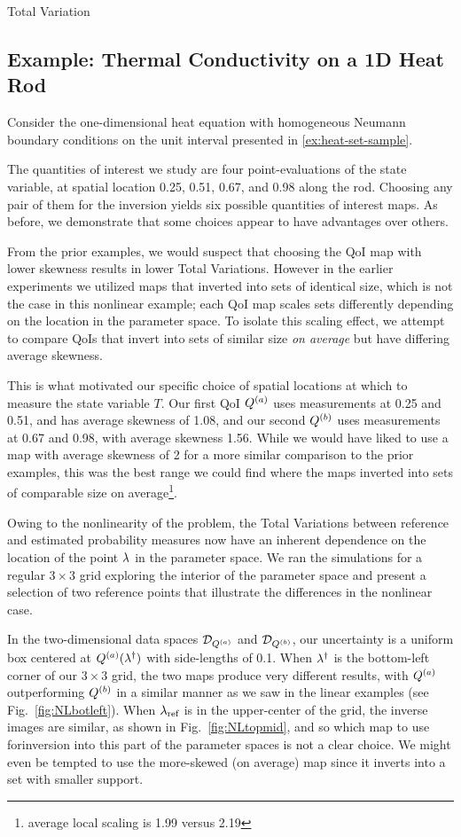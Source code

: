 Total Variation\subsection{Example: Thermal Conductivity on a 1D Heat Rod}\label{ex:heat-set-sample-accuracy}

Consider the one-dimensional heat equation with homogeneous Neumann boundary conditions on the unit interval presented in \ref{ex:heat-set-sample}.


The quantities of interest we study are four point-evaluations of the state variable, at spatial location 0.25, 0.51, 0.67, and 0.98 along the rod.
Choosing any pair of them for the inversion yields six possible quantities of interest maps.
As before, we demonstrate that some choices appear to have advantages over others.

From the prior examples, we would suspect that choosing the QoI map with lower skewness results in lower Total Variations.
However in the earlier experiments we utilized maps that inverted into sets of identical size, which is not the case in this nonlinear example; each QoI map scales sets differently depending on the location in the parameter space.
To isolate this scaling effect, we attempt to compare QoIs that invert into sets of similar size \emph{on average} but have differing average skewness.

This is what motivated our specific choice of spatial locations at which to measure the state variable $T$.
Our first QoI $Q^{(a)}$ uses measurements at 0.25 and 0.51, and has average skewness of 1.08, and our second $Q^{(b)}$ uses measurements at 0.67 and 0.98, with average skewness 1.56.
While we would have liked to use a map with average skewness of 2 for a more similar comparison to the prior examples, this was the best range we could find where the maps inverted into sets of comparable size on average\footnote{average local scaling is 1.99 versus 2.19}.

Owing to the nonlinearity of the problem, the Total Variations between reference and estimated probability measures now have an inherent dependence on the location of the point $\lambda$ in the parameter space.
We ran the simulations for a regular $3\times3$ grid exploring the interior of the parameter space and present a selection of two reference points that illustrate the differences in the nonlinear case.

In the two-dimensional data spaces $\mathcal{D}_{Q^{(a)}}$ and $\mathcal{D}_{Q^{(b)}}$, our uncertainty is a uniform box centered at $Q^{(a)}(\lambda^\dagger)$ with side-lengths of 0.1.
When $\lambda^\dagger$ is the bottom-left corner of our $3\times3$ grid, the two maps produce very different results, with $Q^{(a)}$ outperforming $Q^{(b)}$ in a similar manner as we saw in the linear examples (see Fig.~\ref{fig:NLbotleft}).
When $\lambda_{\text{ref}}$ is in the upper-center of the grid, the inverse images are similar, as shown in Fig.~\ref{fig:NLtopmid}, and so which map to use forinversion into this part of the parameter spaces is not a clear choice. We might even be tempted to use the more-skewed (on average) map since it inverts into a set with smaller support.


